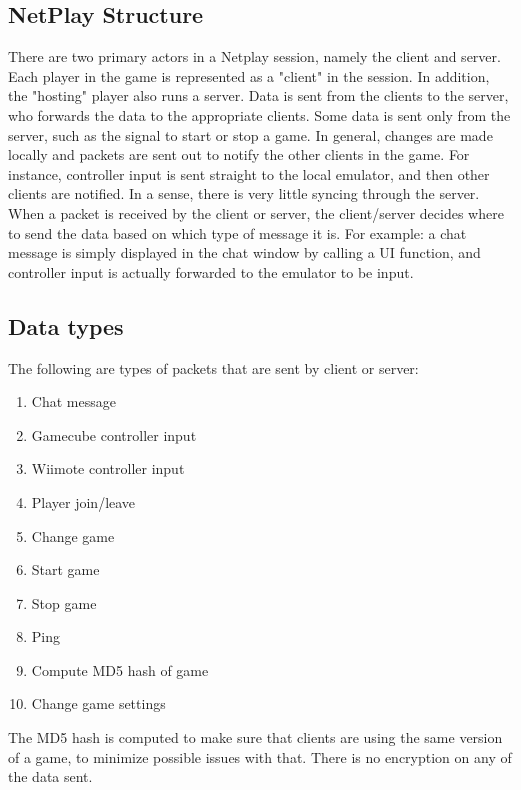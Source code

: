 \documentclass[conference]{IEEEtran}
\begin{document}
\subsection{ NetPlay Structure }
There are two primary actors in a Netplay session, namely the client and server.
Each player in the game is represented as a "client" in the session.
In addition, the "hosting" player also runs a server.
Data is sent from the clients to the server, who forwards the data to the appropriate clients.
Some data is sent only from the server, such as the signal to start or stop a game.
In general, changes are made locally and packets are sent out to notify the other clients in the game.
For instance, controller input is sent straight to the local emulator, and then other clients are notified.
In a sense, there is very little syncing through the server.
When a packet is received by the client or server, the client/server decides where to send the data based on which type of message it is.
For example: a chat message is simply displayed in the chat window by calling a UI function, and controller input is actually forwarded to the emulator to be input.

\subsection{Data types}
The following are types of packets that are sent by client or server:

\vspace{0.5cm}
\begin{enumerate}  
\item Chat message
\item Gamecube controller input
\item Wiimote controller input
\item Player join/leave
\item Change game
\item Start game
\item Stop game
\item Ping
\item Compute MD5 hash of game
\item Change game settings
\end{enumerate}
\vspace{0.5cm}

The MD5 hash is computed to make sure that clients are using the same version of a game, to minimize possible issues with that.
There is no encryption on any of the data sent.
\end{document}
